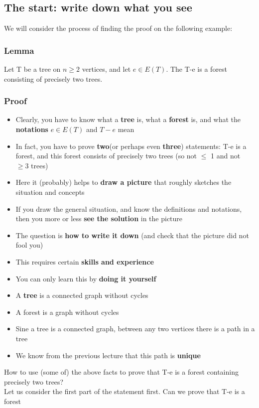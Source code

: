 \documentclass{article}[18pt]
\begin{document}
\subsection{The start: write down what you see}
We will consider the process of finding the proof on the following example:
\subsubsection{Lemma}
Let T be a tree on $n\geqslant 2$ vertices, and let $e\in E(T)$. The T-e is a forest consisting of precisely two trees.
\subsubsection{Proof}
\begin{itemize}
	\item Clearly, you have to know what a \textbf{tree} is, what a \textbf{forest} is, and what the \textbf{notations} $e\in E(T)$ and $T-e$ mean
	\item In fact, you have to prove \textbf{two}(or perhaps even \textbf{three}) statements: T-e is a forest, and this forest consists of precisely two trees (so not $\leqslant$ 1 and not $\geqslant 3$ trees)
	\item Here it (probably) helps to \textbf{draw a picture} that roughly sketches the situation and concepts
	\item If you draw the general situation, and know the definitions and notations, then you more or less \textbf{see the solution} in the picture
	\item The question is \textbf{how to write it down} (and check that the picture did not fool you)
	\item This requires certain \textbf{skills and experience}
	\item You can only learn this by \textbf{doing it yourself}
	\item A \textbf{tree} is a connected graph without cycles
	\item A forest is a graph without cycles
	\item Sine a tree is a connected graph, between any two vertices there is a path in a tree
	\item We know from the previous lecture that this path is \textbf{unique}
\end{itemize}
How to use (some of) the above facts to prove that T-e is a forest containing precisely two trees?\\
Let us consider the first part of the statement first. Can we prove that T-e is a forest\\
\end{document}
